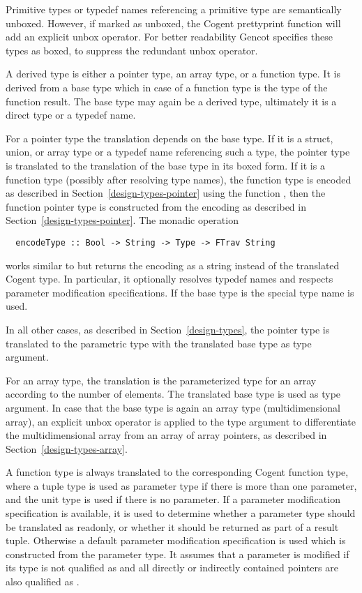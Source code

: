 Primitive types or typedef names referencing a primitive type are semantically unboxed. However, if marked as unboxed, 
the Cogent prettyprint function will add an explicit unbox operator. For better readability Gencot specifies these types
as boxed, to suppress the redundant unbox operator.

A derived type is either a pointer type, an array type, or a function type. It is derived from a base type
which in case of a function type is the type of the function result. The base type may again be a derived
type, ultimately it is a direct type or a typedef name.

For a pointer type the translation depends on the base type. If it is a struct, union, or array type or a typedef
name referencing such a type, the pointer type is translated to the translation of the base type in its
boxed form. If it is a function type (possibly after resolving type names), the function type
is encoded as described in Section~\ref{design-types-pointer} using the function , then the function
pointer type is constructed from the encoding as described in Section~\ref{design-types-pointer}. The monadic operation
\begin{verbatim}
  encodeType :: Bool -> String -> Type -> FTrav String
\end{verbatim}
works similar to  but returns the encoding as a string instead of the translated 
Cogent type. In particular, it optionally resolves typedef names and respects parameter modification specifications.
If the base type is  the special type name  is used.

In all other cases, as described in Section~\ref{design-types}, 
the pointer type is translated to the parametric type  with the translated base type as type argument.

For an array type, the translation is the parameterized type for an array according to the number of elements. 
The translated base type is used as type argument. In case that the base type is again an array type (multidimensional
array), an explicit unbox operator is applied to the type argument to differentiate the multidimensional array 
from an array of array pointers, as described in Section~\ref{design-types-array}.

A function type is always translated to the corresponding Cogent function type, where a tuple type is
used as parameter type if there is more than one parameter, and the unit type is used if there is
no parameter. If a parameter modification specification is available, it is used to determine whether a parameter type
should be translated as readonly, or whether it should be returned as part of a result tuple. Otherwise
a default parameter modification specification is used which is constructed from the parameter type.
It assumes that a parameter is modified if its type is not qualified as  and all directly or indirectly 
contained pointers are also qualified as .


